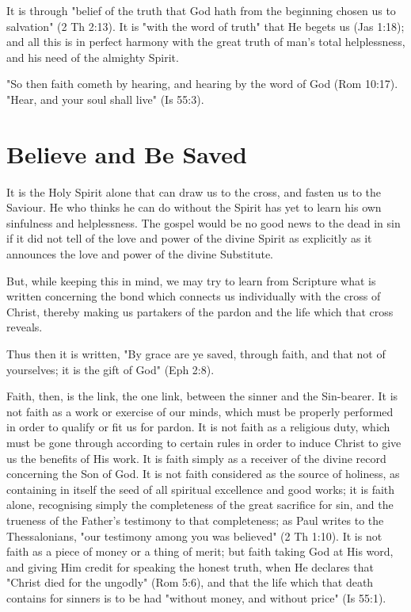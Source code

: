 \documentclass[
]{book}
\begin{document}
It is through "belief of the truth that God hath from the beginning chosen us to salvation" (2 Th 2:13). It is "with the word of truth" that He begets us (Jas 1:18); and all this is in perfect harmony with the great truth of man's total helplessness, and his need of the almighty Spirit.

"So then faith cometh by hearing, and hearing by the word of God (Rom 10:17). "Hear, and your soul shall live" (Is 55:3).

\hypertarget{believe-and-be-saved}{%
\chapter{Believe and Be Saved}\label{believe-and-be-saved}}

It is the Holy Spirit alone that can draw us to the cross, and fasten us to the Saviour. He who thinks he can do without the Spirit has yet to learn his own sinfulness and helplessness. The gospel would be no good news to the dead in sin if it did not tell of the love and power of the divine Spirit as explicitly as it announces the love and power of the divine Substitute.

But, while keeping this in mind, we may try to learn from Scripture what is written concerning the bond which connects us individually with the cross of Christ, thereby making us partakers of the pardon and the life which that cross reveals.

Thus then it is written, "By grace are ye saved, through faith, and that not of yourselves; it is the gift of God" (Eph 2:8).

Faith, then, is the link, the one link, between the sinner and the Sin-bearer. It is not faith as a work or exercise of our minds, which must be properly performed in order to qualify or fit us for pardon. It is not faith as a religious duty, which must be gone through according to certain rules in order to induce Christ to give us the benefits of His work. It is faith simply as a receiver of the divine record concerning the Son of God. It is not faith considered as the source of holiness, as containing in itself the seed of all spiritual excellence and good works; it is faith alone, recognising simply the completeness of the great sacrifice for sin, and the trueness of the Father's testimony to that completeness; as Paul writes to the Thessalonians, "our testimony among you was believed" (2 Th 1:10). It is not faith as a piece of money or a thing of merit; but faith taking God at His word, and giving Him credit for speaking the honest truth, when He declares that "Christ died for the ungodly" (Rom 5:6), and that the life which that death contains for sinners is to be had "without money, and without price" (Is 55:1).
\end{document}
